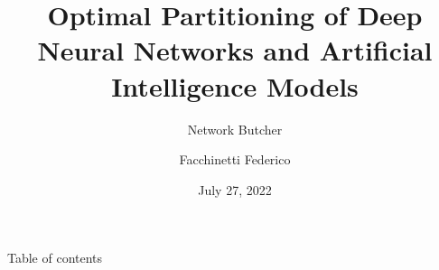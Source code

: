 \documentclass[aspectratio=169,xcolor=dvipsnames,xcolor=table]{beamer}
\title[Network-butcher]{Optimal Partitioning of Deep Neural Networks and Artificial Intelligence Models}
\subtitle{Network Butcher}
\author[Facchinetti] {Facchinetti Federico}
\date{July 27, 2022} %
\begin{document}
\begin{frame}
    \titlepage
\end{frame}

\begin{frame}{Table of contents}
      \tableofcontents
\end{frame}






\end{document}
